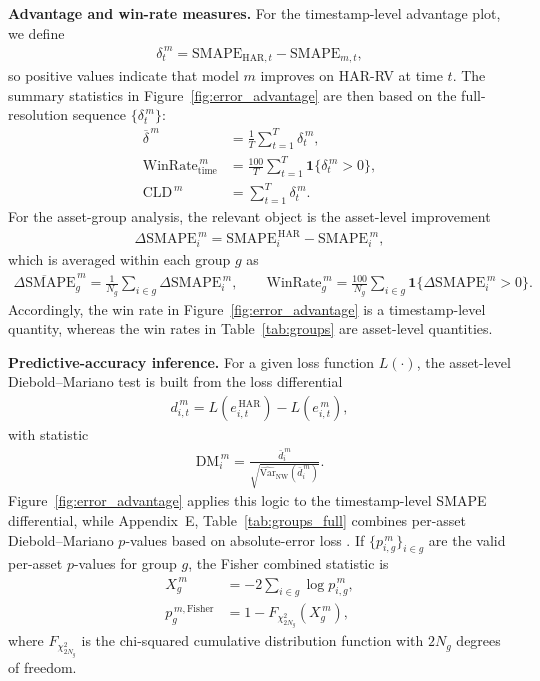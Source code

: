 ﻿\documentclass[11pt,a4paper]{article}
\begin{document}
\vspace{0.15cm}
\noindent \textbf{Advantage and win-rate measures.}
For the timestamp-level advantage plot, we define
\begin{align*}
\delta_t^{\,m}
=
\mathrm{SMAPE}_{\mathrm{HAR},t}
-
\mathrm{SMAPE}_{m,t},
\end{align*}
so positive values indicate that model $m$ improves on HAR-RV at time $t$. The summary statistics in Figure~\ref{fig:error_advantage} are then based on the full-resolution sequence $\{\delta_t^{\,m}\}$:
\begin{align*}
\overline{\delta}^{\,m} &= \frac{1}{T}\sum_{t=1}^{T}\delta_t^{\,m},\\
\mathrm{WinRate}^{\,m}_{\mathrm{time}} &= \frac{100}{T}\sum_{t=1}^{T}\mathbf{1}\{\delta_t^{\,m}>0\},\\
\mathrm{CLD}^{\,m} &= \sum_{t=1}^{T}\delta_t^{\,m}.
\end{align*}
For the asset-group analysis, the relevant object is the asset-level improvement
\begin{align*}
\Delta \mathrm{SMAPE}_i^{\,m}
=
\mathrm{SMAPE}^{\,\mathrm{HAR}}_i
-
\mathrm{SMAPE}^{\,m}_i,
\end{align*}
which is averaged within each group $g$ as
\begin{align*}
\overline{\Delta \mathrm{SMAPE}}^{\,m}_g
=
\frac{1}{N_g}\sum_{i \in g}\Delta \mathrm{SMAPE}_i^{\,m},
\qquad
\mathrm{WinRate}^{\,m}_g
=
\frac{100}{N_g}\sum_{i \in g}\mathbf{1}\{\Delta \mathrm{SMAPE}_i^{\,m}>0\}.
\end{align*}
Accordingly, the win rate in Figure~\ref{fig:error_advantage} is a timestamp-level quantity, whereas the win rates in Table~\ref{tab:groups} are asset-level quantities.

\vspace{0.15cm}
\noindent \textbf{Predictive-accuracy inference.}
For a given loss function $L(\cdot)$, the asset-level Diebold--Mariano test is built from the loss differential
\begin{align*}
d^{\,m}_{i,t}
=
L\!\left(e^{\,\mathrm{HAR}}_{i,t}\right)
-
L\!\left(e^{\,m}_{i,t}\right),
\end{align*}
with statistic
\begin{align*}
\mathrm{DM}^{\,m}_i
=
\frac{\bar{d}^{\,m}_i}{\sqrt{\widehat{\mathrm{Var}}_{\mathrm{NW}}(\bar{d}^{\,m}_i)}}.
\end{align*}
Figure~\ref{fig:error_advantage} applies this logic to the timestamp-level SMAPE differential, while Appendix~E, Table~\ref{tab:groups_full} combines per-asset Diebold--Mariano $p$-values based on absolute-error loss \cite{diebold1995}. If $\{p^{\,m}_{i,g}\}_{i \in g}$ are the valid per-asset $p$-values for group $g$, the Fisher combined statistic is
\begin{align*}
X^{\,m}_g &= -2\sum_{i \in g}\log p^{\,m}_{i,g},\\
p^{\,m,\mathrm{Fisher}}_g &= 1 - F_{\chi^2_{2N_g}}\!\left(X^{\,m}_g\right),
\end{align*}
where $F_{\chi^2_{2N_g}}$ is the chi-squared cumulative distribution function with $2N_g$ degrees of freedom.
\end{document}
